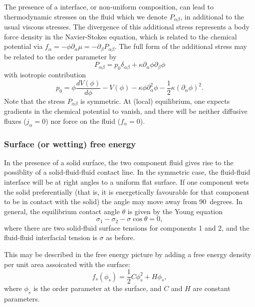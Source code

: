The presence of a interface, or non-uniform composition, can lead to
thermodynamic stresses on the fluid which we denote $P_{\alpha\beta}$,
in additional to the usual viscous
stresses. The divergence of this
additional stress represents a body force density in the Navier-Stokes
equation, which is related to the chemical potential via
$f_\alpha = -\phi\partial_\alpha \mu = -\partial_\beta P_{\alpha\beta}$.
The full form of the additional stress may be related to the order
parameter by
\begin{equation}
P_{\alpha\beta} = p_0 \delta_{\alpha\beta}
  + \kappa \partial_\alpha \phi \partial_\beta \phi
\end{equation}
with isotropic contribution
\begin{equation}
p_0 = \phi \frac{dV(\phi)}{d\phi} -  V(\phi)
-\kappa\phi\partial_\alpha^2 \phi - \textstyle{\frac{1}{2}} \kappa (\partial_\alpha \phi)^2.
\end{equation}
Note that the stress $P_{\alpha\beta}$ is symmetric. At (local) equilibrium,
one expects gradients in the chemical potential to vanish,
and there will be neither diffusive fluxes ($j_\alpha = 0$) nor force on
the fluid ($f_\alpha = 0$).

\subsubsection{Surface (or wetting) free energy}

In the presence of a solid surface, the two component fluid gives
rise to the possiblity of a solid-fluid-fluid contact line. In the
symmetric case, the fluid-fluid interface will be at right angles to
a uniform flat surface. If one component wets the solid preferentially
(that is, it is energetically favourable for that component to be
in contact with the solid) the angle may move away from
90~degrees.
In general, the equilibrium contact angle $\theta$ is given by the
Young equation
\begin{equation}
\sigma_1 - \sigma_2 - \sigma \cos\theta = 0,
\end{equation}
where there are two solid-fluid surface tensions for components 1 and 2,
and the fluid-fluid interfacial tension is $\sigma$ as before.

This may be described in the free energy picture by adding a free
energy density per unit area assoicated with the surface:
\begin{equation}
f_s (\phi_s)= \textstyle{\frac{1}{2}} C \phi_s^2 + H \phi_s,
\end{equation}
where $\phi_s$ is the order parameter at the surface, and $C$ and $H$ are
constant parameters.

